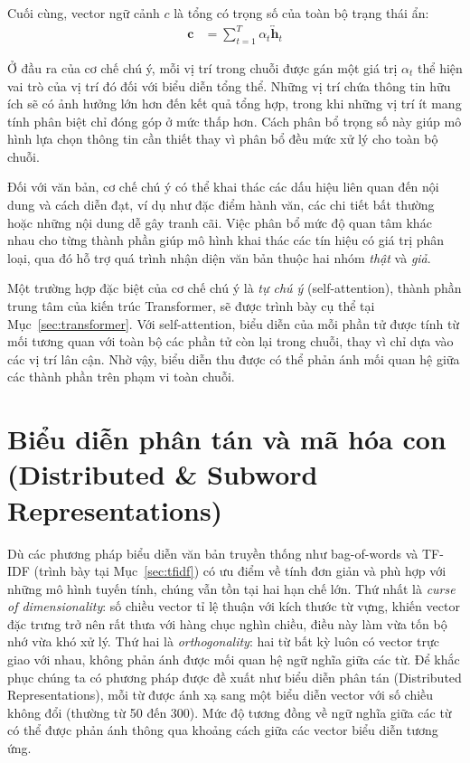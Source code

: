 Cuối cùng, vector ngữ cảnh $c$ là tổng có trọng số của toàn bộ trạng thái ẩn:
\begin{align}
  \mathbf{c} &= \sum_{t=1}^{T} \alpha_t \overleftrightarrow{\mathbf{h}}_t
\end{align}

Ở đầu ra của cơ chế chú ý, mỗi vị trí trong chuỗi được gán một giá trị $\alpha_t$ thể hiện vai trò của vị trí đó đối với biểu diễn tổng thể. Những vị trí chứa thông tin hữu ích sẽ có ảnh hưởng lớn hơn đến kết quả tổng hợp, trong khi những vị trí ít mang tính phân biệt chỉ đóng góp ở mức thấp hơn. Cách phân bổ trọng số này giúp mô hình lựa chọn thông tin cần thiết thay vì phân bổ đều mức xử lý cho toàn bộ chuỗi.

Đối với văn bản, cơ chế chú ý có thể khai thác các dấu hiệu liên quan đến nội dung và cách diễn đạt, ví dụ như đặc điểm hành văn, các chi tiết bất thường hoặc những nội dung dễ gây tranh cãi. Việc phân bổ mức độ quan tâm khác nhau cho từng thành phần giúp mô hình khai thác các tín hiệu có giá trị phân loại, qua đó hỗ trợ quá trình nhận diện văn bản thuộc hai nhóm \textit{thật} và \textit{giả}.

Một trường hợp đặc biệt của cơ chế chú ý là \textit{tự chú ý} (self-attention), thành phần trung tâm của kiến trúc Transformer, sẽ được trình bày cụ thể tại Mục~\ref{sec:transformer}. Với self-attention, biểu diễn của mỗi phần tử được tính từ mối tương quan với toàn bộ các phần tử còn lại trong chuỗi, thay vì chỉ dựa vào các vị trí lân cận. Nhờ vậy, biểu diễn thu được có thể phản ánh mối quan hệ giữa các thành phần trên phạm vi toàn chuỗi.

\section{Biểu diễn phân tán và mã hóa con (Distributed \& Subword Representations)}\label{sec:embedding}
Dù các phương pháp biểu diễn văn bản truyền thống như bag-of-words và TF-IDF (trình bày tại Mục~\ref{sec:tfidf}) có ưu điểm về tính đơn giản và phù hợp với những mô hình tuyến tính, chúng vẫn tồn tại hai hạn chế lớn. Thứ nhất là \textit{curse of dimensionality}: số chiều vector tỉ lệ thuận với kích thước từ vựng, khiến vector đặc trưng trở nên rất thưa với hàng chục nghìn chiều, điều này làm vừa tốn bộ nhớ vừa khó xử lý. Thứ hai là \textit{orthogonality}: hai từ bất kỳ luôn có vector trực giao với nhau, không phản ánh được mối quan hệ ngữ nghĩa giữa các từ. Để khắc phục chúng ta có phương pháp được đề xuất như biểu diễn phân tán (Distributed Representations), mỗi từ được ánh xạ sang một biểu diễn vector với số chiều không đổi (thường từ 50 đến 300). Mức độ tương đồng về ngữ nghĩa giữa các từ có thể được phản ánh thông qua khoảng cách giữa các vector biểu diễn tương ứng.

